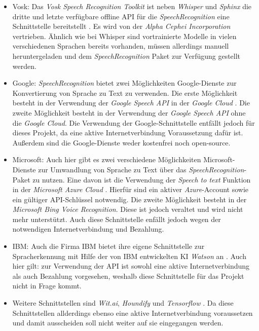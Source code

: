 \begin{itemize}
    \item Vosk: Das \textit{Vosk Speech Recognition Toolkit} ist neben \textit{Whisper} und \textit{Sphinx} die dritte und letzte verfügbare offline \ac{API} für die \textit{SpeechRecognition} eine Schnittstelle bereitstellt \cite{vosk,vosk_repo}. Es wird von der \textit{Alpha Cephei Incorporation} vertrieben. Ähnlich wie bei Whisper sind vortrainierte Modelle in vielen verschiedenen Sprachen bereits vorhanden, müssen allerdings manuell heruntergeladen und dem \textit{SpeechRecognition} Paket zur Verfügung gestellt werden.
    \item Google: \textit{SpeechRecognition} bietet zwei Möglichkeiten Google-Dienste zur Konvertierung von Sprache zu Text zu verwenden. Die erste Möglichkeit besteht in der Verwendung der \textit{Google Speech API} in der \textit{Google Cloud} \cite{google_cloud_speech}. Die zweite Möglichkeit besteht in der Verwendung der \textit{Google Speech API} ohne die \textit{Google Cloud}. Die Verwendung der Google-Schnittstelle entfällt jedoch für dieses Projekt, da eine aktive Internetverbindung Voraussetzung dafür ist. Außerdem sind die Google-Dienste weder kostenfrei noch open-source.
    \item Microsoft: Auch hier gibt es zwei verschiedene Möglichkeiten Microsoft-Dienste zur Umwandlung von Sprache zu Text über das \textit{SpeechRecognition}-Paket zu nutzen. Eine davon ist die Verwendung der \textit{Speech to text} Funktion in der \textit{Microsoft Azure Cloud} \cite{azure_speech_to_text}. Hierfür sind ein aktiver \textit{Azure}-Account sowie ein gültiger \ac{API}-Schlüssel notwendig. Die zweite Möglichkeit besteht in der \textit{Microsoft Bing Voice Recognition}. Diese ist jedoch veraltet und wird nicht mehr unterstützt. Auch diese Schnittstelle enfällt jedoch wegen der notwendigen Internetverbindung und Bezahlung. 
    \item IBM: Auch die Firma IBM bietet ihre eigene Schnittstelle zur Spracherkennung mit Hilfe der von IBM entwickelten \ac{KI} \textit{Watson} an \cite{ibm_speech_to_text}. Auch hier gilt: zur Verwendung der \ac{API} ist sowohl eine aktive Internetverbindung als auch Bezahlung vorgesehen, weshalb diese Schnittstelle für das Projekt nicht in Frage kommt.
    \item Weitere Schnittstellen sind \textit{Wit.ai}, \textit{Houndify} und \textit{Tensorflow} \cite{witai,houndify,tensorflow_home}. Da diese Schnittstellen allderdings ebenso eine aktive Internetverbindung voraussetzen und damit ausscheiden soll nicht weiter auf sie eingegangen werden.
\end{itemize}
